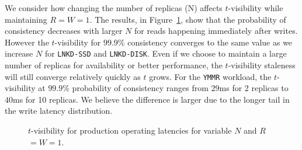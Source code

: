 \documentclass{vldb}
\begin{document}
We consider how changing the number of replicas (N) affects
$t$-visibility while maintaining $R$$=$$W$$=$$1$. The results, in
Figure~\ref{fig:varyn}, show that the probability of consistency
decreases with larger $N$ for reads happening immediately after
writes.  However the $t$-visibility for $99.9\%$ consistency converges
to the same value as we increase $N$ for \texttt{LNKD-SSD} and
\texttt{LNKD-DISK}.  Even if we choose to maintain a large number of
replicas for availability or better performance, the $t$-visibility
staleness will still converge relatively quickly as $t$ grows. For the
\texttt{YMMR} workload, the $t$-visibility at $99.9\%$ probability of
consistency ranges from $29$ms for 2 replicas to $40$ms for 10
replicas. We believe the difference is larger due to the longer tail
in the write latency distribution.

\begin{figure}
\centering
{}
\caption{$t$-visibility for production operating latencies for variable $N$ and $R$$=$$W$$=$$1$.}
\label{fig:varyn}
\end{figure}
\end{document}
